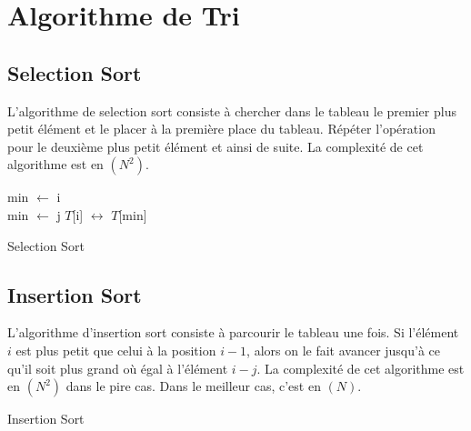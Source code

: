 
\chapter{Algorithme de Tri}
\section{Selection Sort}
L'algorithme de selection sort consiste à chercher dans le tableau le premier plus petit élément et le placer à la première place du tableau. Répéter l'opération pour le deuxième plus petit élément et ainsi de suite. La complexité de cet algorithme est en \bigO$(N^2)$.
 
\begin{algorithm}
 \SetAlgoLined
 {min $\leftarrow$ i\\
  {
  {
  min $\leftarrow$ j
  }
 }
 {
 $T$[i] $\leftrightarrow$ $T$[min]
 }
 }
 \caption{Selection Sort}
\end{algorithm}

\section{Insertion Sort}
L'algorithme d'insertion sort consiste à parcourir le tableau une fois. Si l'élément $i$ est plus petit que celui à la position $i-1$, alors on le fait avancer jusqu'à ce qu'il soit plus grand où égal à l'élément $i-j$. La complexité de cet algorithme est en \bigO$(N^2)$ dans le pire cas. Dans le meilleur cas, c'est en \bigO$(N)$.
\begin{algorithm}
 \SetAlgoLined
 \caption{Insertion Sort}
\end{algorithm}

